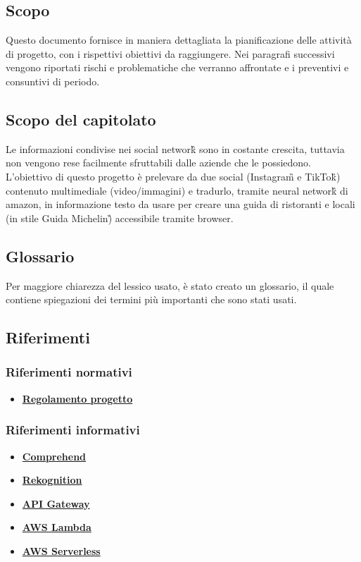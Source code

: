 \subsection{Scopo}
Questo documento fornisce in maniera dettagliata la pianificazione delle attività di progetto, con i rispettivi obiettivi da raggiungere. Nei paragrafi successivi vengono riportati rischi e problematiche che verranno affrontate e i preventivi e consuntivi di periodo.

\subsection{Scopo del capitolato}
Le informazioni condivise nei social network\G{} sono in costante crescita, tuttavia non vengono rese facilmente sfruttabili dalle aziende che le possiedono. L'obiettivo di questo progetto è prelevare da due social (Instagram\G{} e TikTok\G{}) contenuto multimediale (video/immagini) e tradurlo, tramite neural network\G{} di amazon, in informazione testo da usare per creare una guida di ristoranti e locali (in stile Guida Michelin\G) accessibile tramite browser.

\subsection{Glossario}
Per maggiore chiarezza del lessico usato, è stato creato un glossario, il quale contiene spiegazioni dei termini più importanti che sono stati usati.

\subsection{Riferimenti} %
\subsubsection{Riferimenti normativi}
\begin{itemize}
	\item
	\href{https://www.math.unipd.it/~tullio/IS-1/2021/Dispense/PD2.pdf}{\textbf{Regolamento progetto}}
	
\end{itemize}
\subsubsection{Riferimenti informativi}
\begin{itemize}
	\item \href{https://docs.aws.amazon.com/comprehend/latest/dg/what-is.html}{\textbf{Comprehend}}
	\item
	\href{https://docs.aws.amazon.com/rekognition/latest/dg/what-is.html}{\textbf{Rekognition}}
	\item
	\href{https://docs.aws.amazon.com/apigateway/latest/developerguide/welcome.html}{\textbf{API Gateway}}
	\item
	\href{https://docs.aws.amazon.com/lambda/latest/dg/welcome.html}{\textbf{AWS Lambda}}
	\item
	\href{https://docs.aws.amazon.com/serverless-application-model/latest/developerguide/what-is-sam.html}{\textbf{AWS Serverless}}
\end{itemize}
